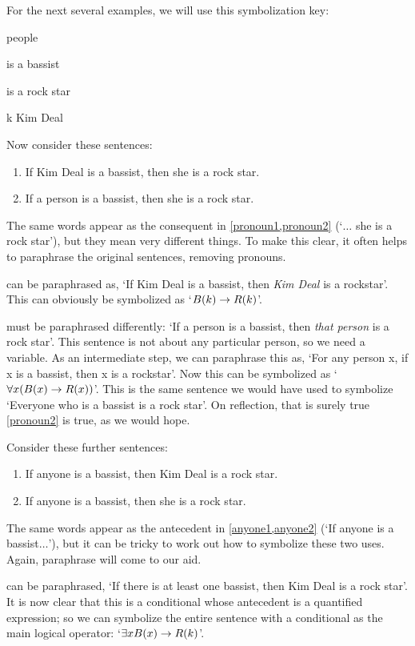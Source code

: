 For the next several examples, we will use this symbolization key:
	\begin{ekey}
		\item[\text{domain}] people
		\item[\atom{B}{x}]  is a bassist
		\item[\atom{R}{x}]  is a rock star
		\item[k] Kim Deal
	\end{ekey}
Now consider these sentences:
	\begin{enumerate}
		\item\label{pronoun1} If Kim Deal is a bassist, then she is a rock star.
		\item\label{pronoun2} If a person is a bassist, then she is a rock star.
	\end{enumerate}
The same words appear as the consequent in \cref*{pronoun1,pronoun2} (`$\ldots$ she is a rock star'), but they mean very different things. To make this clear, it often helps to paraphrase the original sentences, removing pronouns.

 can be paraphrased as, `If Kim Deal is a bassist, then \emph{Kim Deal} is a rockstar'. This can obviously be symbolized as `$B(k) \rightarrow R(k)$'.

 must be paraphrased differently: `If a person is a bassist, then \emph{that person} is a rock star'. This sentence is not about any particular person, so we need a variable. As an intermediate step, we can paraphrase this as, `For any person x, if x is a bassist, then x is a rockstar'. Now this can be symbolized as `$\forall x (B(x) \rightarrow R(x))$'. This is the same sentence we would have used to symbolize `Everyone who is a bassist is a rock star'. On reflection, that is surely true \ifeff{} \cref*{pronoun2} is true, as we would hope.

Consider these further sentences:
	\begin{enumerate}
		\item\label{anyone1} If anyone is a bassist, then Kim Deal is a rock star.
		\item\label{anyone2} If anyone is a bassist, then she is a rock star.
	\end{enumerate}
The same words appear as the antecedent in \cref*{anyone1,anyone2}  (`If anyone is a bassist$\ldots$'), but it can be tricky to work out how to symbolize these two uses. Again, paraphrase will come to our aid.

 can be paraphrased, `If there is at least one bassist, then Kim Deal is a rock star'. It is now clear that this is a conditional whose antecedent is a quantified expression; so we can symbolize the entire sentence with a conditional as the main logical operator: `$\exists x B(x) \rightarrow R(k)$'.

